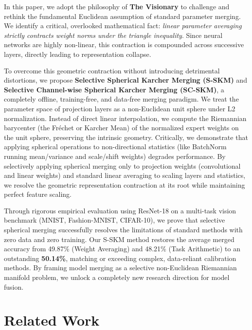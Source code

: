 \documentclass{article}
\begin{document}
In this paper, we adopt the philosophy of \textbf{The Visionary} to challenge and rethink the fundamental Euclidean assumption of standard parameter merging. We identify a critical, overlooked mathematical fact: \emph{linear parameter averaging strictly contracts weight norms under the triangle inequality}. Since neural networks are highly non-linear, this contraction is compounded across successive layers, directly leading to representation collapse. 

To overcome this geometric contraction without introducing detrimental distortions, we propose \textbf{Selective Spherical Karcher Merging (S-SKM)} and \textbf{Selective Channel-wise Spherical Karcher Merging (SC-SKM)}, a completely offline, training-free, and data-free merging paradigm. We treat the parameter space of projection layers as a non-Euclidean unit sphere under L2 normalization. Instead of direct linear interpolation, we compute the Riemannian barycenter (the Fréchet or Karcher Mean) of the normalized expert weights on the unit sphere, preserving the intrinsic geometry. Critically, we demonstrate that applying spherical operations to non-directional statistics (like BatchNorm running mean/variance and scale/shift weights) degrades performance. By selectively applying spherical merging only to projection weights (convolutional and linear weights) and standard linear averaging to scaling layers and statistics, we resolve the geometric representation contraction at its root while maintaining perfect feature scaling.

Through rigorous empirical evaluation using ResNet-18 on a multi-task vision benchmark (MNIST, Fashion-MNIST, CIFAR-10), we prove that selective spherical merging successfully resolves the limitations of standard methods with zero data and zero training. Our S-SKM method restores the average merged accuracy from 49.87\% (Weight Averaging) and 48.21\% (Task Arithmetic) to an outstanding \textbf{50.14\%}, matching or exceeding complex, data-reliant calibration methods. By framing model merging as a selective non-Euclidean Riemannian manifold problem, we unlock a completely new research direction for model fusion.

\section{Related Work}
\end{document}
